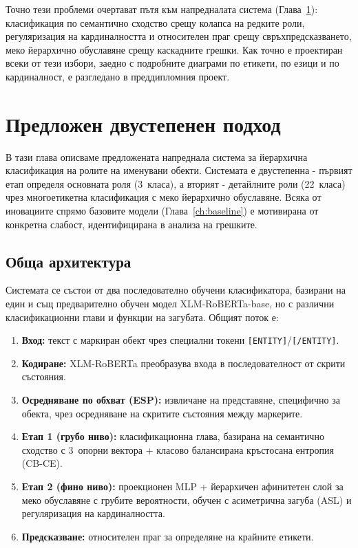 \documentclass[12pt,a4paper]{report}
\begin{document}
Точно тези проблеми очертават пътя към напредналата система (Глава~\ref{ch:proposed}): класификация по семантично сходство срещу колапса на редките роли, регуляризация на кардиналността и относителен праг срещу свръхпредсказването, меко йерархично обуславяне срещу каскадните грешки. Как точно е проектиран всеки от тези избори, заедно с подробните диаграми по етикети, по езици и по кардиналност, е разгледано в преддипломния проект.

\chapter{Предложен двустепенен подход}
\label{ch:proposed}

В тази глава описваме предложената напреднала система за йерархична класификация на ролите на именувани обекти. Системата е двустепенна - първият етап определя основната роля (3~класа), а вторият - детайлните роли (22~класа) чрез многоетикетна класификация с меко йерархично обуславяне. Всяка от иновациите спрямо базовите модели (Глава~\ref{ch:baseline}) е мотивирана от конкретна слабост, идентифицирана в анализа на грешките.

\section{Обща архитектура}
\label{sec:architecture}

Системата се състои от два последователно обучени класификатора, базирани на един и същ предварително обучен модел XLM-RoBERTa-base, но с различни класификационни глави и функции на загубата. Общият поток е:

\begin{enumerate}
  \item \textbf{Вход:} текст с маркиран обект чрез специални токени \texttt{[ENTITY]}/\texttt{[/ENTITY]}.
  \item \textbf{Кодиране:} XLM-RoBERTa преобразува входа в последователност от скрити състояния.
  \item \textbf{Осредняване по обхват (ESP):} извличане на представяне, специфично за обекта, чрез осредняване на скритите състояния между маркерите.
  \item \textbf{Етап 1 (грубо ниво):} класификационна глава, базирана на семантично сходство с 3~опорни вектора + класово балансирана кръстосана ентропия (CB-CE).
  \item \textbf{Етап 2 (фино ниво):} проекционен MLP + йерархичен афинитетен слой за меко обуславяне с грубите вероятности, обучен с асиметрична загуба (ASL) и регуляризация на кардиналността.
  \item \textbf{Предсказване:} относителен праг за определяне на крайните етикети.
\end{enumerate}
\end{document}
